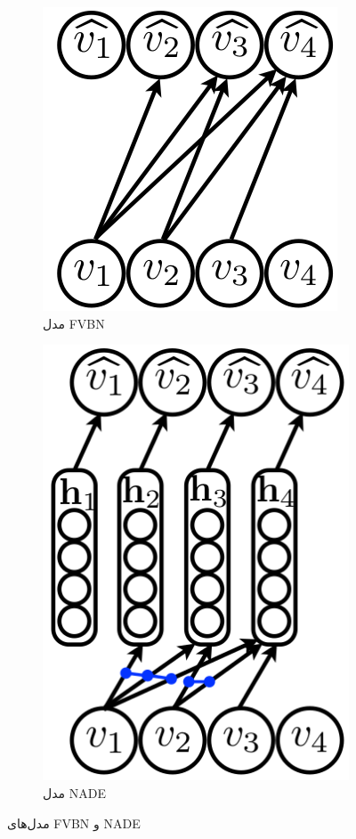	\begin{figure}[!t]
		\centering
		\begin{subfigure}{0.4\textwidth}
			\centering
			\includegraphics[scale=0.25]{chap3-img/FVSBN}
			\caption{مدل FVBN}
			\label{chap3-fig2-1}
		\end{subfigure}		
		\begin{subfigure}{0.4\textwidth}
			\centering
			\includegraphics[scale=0.25]{chap3-img/NADE}
			\caption{مدل NADE}
			\label{chap3-fig2-2}
		\end{subfigure}
		\caption{مدل‌های FVBN و NADE
			\cite{larochelle2011neural} }
		\label{chap3-fig2}
	\end{figure}


